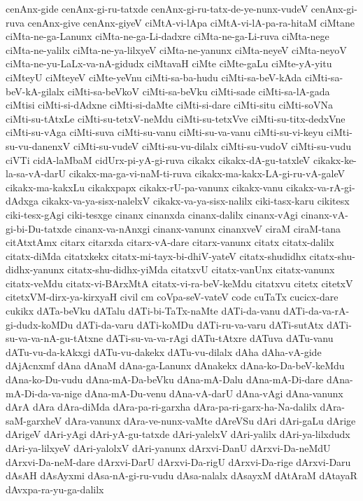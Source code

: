 {cenAnx-gide
cenAnx-gi-ru-tatxde
cenAnx-gi-ru-tatx-de-ye-nunx-vudeV
cenAnx-gi-ruva
cenAnx-give
cenAnx-giyeV
ciMtA-vi-lApa
ciMtA-vi-lA-pa-ra-hitaM
ciMtane
ciMta-ne-ga-Lanunx
ciMta-ne-ga-Li-dadxre
ciMta-ne-ga-Li-ruva
ciMta-nege
ciMta-ne-yalilx
ciMta-ne-ya-lilxyeV
ciMta-ne-yanunx
ciMta-neyeV
ciMta-neyoV
ciMta-ne-yu-LaLx-va-nA-gidudx
ciMtavaH
ciMte
ciMte-gaLu
ciMte-yA-yitu
ciMteyU
ciMteyeV
ciMte-yeVnu
ciMti-sa-ba-hudu
ciMti-sa-beV-kAda
ciMti-sa-beV-kA-gilalx
ciMti-sa-beVkoV
ciMti-sa-beVku
ciMti-sade
ciMti-sa-lA-gada
ciMtisi
ciMti-si-dAdxne
ciMti-si-daMte
ciMti-si-dare
ciMti-situ
ciMti-soVNa
ciMti-su-tAtxLe
ciMti-su-tetxV-neMdu
ciMti-su-tetxVve
ciMti-su-titx-dedxVne
ciMti-su-vAga
ciMti-suva
ciMti-su-vanu
ciMti-su-va-vanu
ciMti-su-vi-keyu
ciMti-su-vu-danenxV
ciMti-su-vudeV
ciMti-su-vu-dilalx
ciMti-su-vudoV
ciMti-su-vudu
ciVTi
cidA-laMbaM
cidUrx-pi-yA-gi-ruva
cikakx
cikakx-dA-gu-tatxleV
cikakx-ke-la-sa-vA-darU
cikakx-ma-ga-vi-naM-ti-ruva
cikakx-ma-kakx-LA-gi-ru-vA-galeV
cikakx-ma-kakxLu
cikakxpapx
cikakx-rU-pa-vanunx
cikakx-vanu
cikakx-va-rA-gi-dAdxga
cikakx-va-ya-sisx-nalelxV
cikakx-va-ya-sisx-nalilx
ciki-tasx-karu
cikitesx
ciki-tesx-gAgi
ciki-tesxge
cinanx
cinanxda
cinanx-dalilx
cinanx-vAgi
cinanx-vA-gi-bi-Du-tatxde
cinanx-va-nAnxgi
cinanx-vanunx
cinanxveV
ciraM
ciraM-tana
citAtxtAmx
citarx
citarxda
citarx-vA-dare
citarx-vanunx
citatx
citatx-dalilx
citatx-diMda
citatxkekx
citatx-mi-tayx-bi-dhiV-yateV
citatx-shudidhx
citatx-shu-didhx-yanunx
citatx-shu-didhx-yiMda
citatxvU
citatx-vanUnx
citatx-vanunx
citatx-veMdu
citatx-vi-BArxMtA
citatx-vi-ra-beV-keMdu
citatxvu
citetx
citetxV
citetxVM-dirx-ya-kirxyaH
civil
cm
coVpa-seV-vateV
code
cuTaTx
cucicx-dare
cukikx
dATa-beVku
dATalu
dATi-bi-TaTx-naMte
dATi-da-vanu
dATi-da-va-rA-gi-dudx-koMDu
dATi-da-varu
dATi-koMDu
dATi-ru-va-varu
dATi-sutAtx
dATi-su-va-va-nA-gu-tAtxne
dATi-su-va-va-rAgi
dATu-tAtxre
dATuva
dATu-vanu
dATu-vu-da-kAkxgi
dATu-vu-dakekx
dATu-vu-dilalx
dAha
dAha-vA-gide
dAjAcnxmf
dAna
dAnaM
dAna-ga-Lanunx
dAnakekx
dAna-ko-Da-beV-keMdu
dAna-ko-Du-vudu
dAna-mA-Da-beVku
dAna-mA-Dalu
dAna-mA-Di-dare
dAna-mA-Di-da-va-nige
dAna-mA-Du-venu
dAna-vA-darU
dAna-vAgi
dAna-vanunx
dArA
dAra
dAra-diMda
dAra-pa-ri-garxha
dAra-pa-ri-garx-ha-Na-dalilx
dAra-saM-garxheV
dAra-vanunx
dAra-ve-nunx-vaMte
dAreVSu
dAri
dAri-gaLu
dArige
dArigeV
dAri-yAgi
dAri-yA-gu-tatxde
dAri-yalelxV
dAri-yalilx
dAri-ya-lilxdudx
dAri-ya-lilxyeV
dAri-yalolxV
dAri-yanunx
dArxvi-DanU
dArxvi-Da-neMdU
dArxvi-Da-neM-dare
dArxvi-DarU
dArxvi-Da-rigU
dArxvi-Da-rige
dArxvi-Daru
dAsAH
dAsAyxmi
dAsa-nA-gi-ru-vudu
dAsa-nalalx
dAsayxM
dAtAraM
dAtayaR
dAvxpa-ra-yu-ga-dalilx
}
